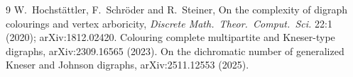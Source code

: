 \documentclass[11pt,a4paper]{article}
\theoremstyle{plain}
\theoremstyle{definition}
\theoremstyle{remark}
\begin{document}


\begin{thebibliography}{9}
 W.~Hochstättler, F.~Schröder and R.~Steiner, On the complexity of digraph colourings and vertex arboricity, \emph{Discrete Math.\ Theor.\ Comput.\ Sci.} 22:1 (2020); arXiv:1812.02420.
 Colouring complete multipartite and Kneser-type digraphs, arXiv:2309.16565 (2023).
 On the dichromatic number of generalized Kneser and Johnson digraphs, arXiv:2511.12553 (2025).
\end{thebibliography}
\end{document}

